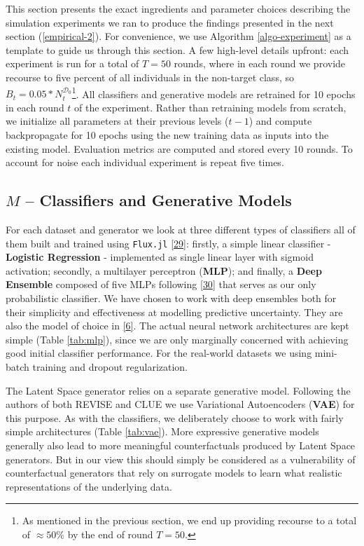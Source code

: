 \documentclass[conference,final,]{IEEEtran}
\begin{document}
This section presents the exact ingredients and parameter choices describing the simulation experiments we ran to produce the findings presented in the next section (\ref{empirical-2}). For convenience, we use Algorithm \ref{algo-experiment} as a template to guide us through this section. A few high-level details upfront: each experiment is run for a total of \(T=50\) rounds, where in each round we provide recourse to five percent of all individuals in the non-target class, so \(B_t=0.05 * N_t^{\mathcal{D}_0}\)\footnote{As mentioned in the previous section, we end up providing recourse to a total of \(\approx50\%\) by the end of round \(T=50\).}. All classifiers and generative models are retrained for 10 epochs in each round \(t\) of the experiment. Rather than retraining models from scratch, we initialize all parameters at their previous levels (\(t-1\)) and compute backpropagate for 10 epochs using the new training data as inputs into the existing model. Evaluation metrics are computed and stored every 10 rounds. To account for noise each individual experiment is repeat five times.

\hypertarget{empirical-classifiers}{%
\subsection{\texorpdfstring{\(M\) -- Classifiers and Generative Models}{M -- Classifiers and Generative Models}}\label{empirical-classifiers}}

For each dataset and generator we look at three different types of classifiers all of them built and trained using \texttt{Flux.jl} \protect\hyperlink{ref-innes2018fashionable}{{[}29{]}}: firstly, a simple linear classifier - \textbf{Logistic Regression} - implemented as single linear layer with sigmoid activation; secondly, a multilayer perceptron (\textbf{MLP}); and finally, a \textbf{Deep Ensemble} composed of five MLPs following \protect\hyperlink{ref-lakshminarayanan2016simple}{{[}30{]}} that serves as our only probabilistic classifier. We have chosen to work with deep ensembles both for their simplicity and effectiveness at modelling predictive uncertainty. They are also the model of choice in \protect\hyperlink{ref-schut2021generating}{{[}6{]}}. The actual neural network architectures are kept simple (Table \ref{tab:mlp}), since we are only marginally concerned with achieving good initial classifier performance. For the real-world datasets we using mini-batch training and dropout regularization.

The Latent Space generator relies on a separate generative model. Following the authors of both REVISE and CLUE we use Variational Autoencoders (\textbf{VAE}) for this purpose. As with the classifiers, we deliberately choose to work with fairly simple architectures (Table \ref{tab:vae}). More expressive generative models generally also lead to more meaningful counterfactuals produced by Latent Space generators. But in our view this should simply be considered as a vulnerability of counterfactual generators that rely on surrogate models to learn what realistic representations of the underlying data.
\end{document}
